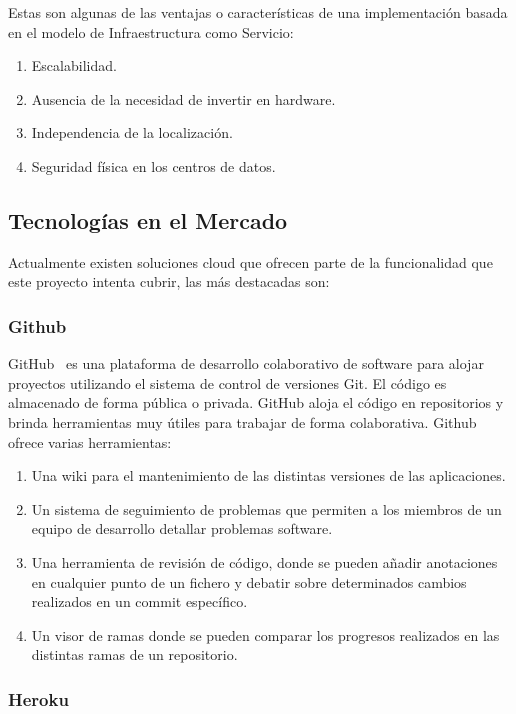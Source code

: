 \documentclass[a4paper,11pt]{book}
\begin{document}
Estas son algunas de las ventajas o características de una implementación basada en el modelo de Infraestructura como Servicio:

\begin{enumerate}
\item Escalabilidad.
\item Ausencia de la necesidad de invertir en hardware.
\item Independencia de la localización.
\item Seguridad física en los centros de datos.
\end{enumerate}

\subsection{Tecnologías en el Mercado}\label{mercado}

Actualmente existen soluciones cloud que ofrecen parte de la funcionalidad que este proyecto intenta cubrir, las más destacadas son: 


\subsubsection{Github}

GitHub~\cite{github} es una plataforma de desarrollo colaborativo de software para alojar proyectos utilizando el sistema de control de versiones Git. El código es almacenado de forma pública o privada. GitHub aloja el código en repositorios y brinda herramientas muy útiles para trabajar de forma colaborativa. Github~\cite{github2} ofrece varias herramientas:

\begin{enumerate}
\item Una wiki para el mantenimiento de las distintas versiones de las aplicaciones.
\item Un sistema de seguimiento de problemas que permiten a los miembros de un equipo de desarrollo detallar problemas software.
\item Una herramienta de revisión de código, donde se pueden añadir anotaciones en cualquier punto de un fichero y debatir sobre determinados cambios realizados en un commit específico.
\item Un visor de ramas donde se pueden comparar los progresos realizados en las distintas ramas de un repositorio.
\end{enumerate}

\subsubsection{Heroku}
\end{document}
